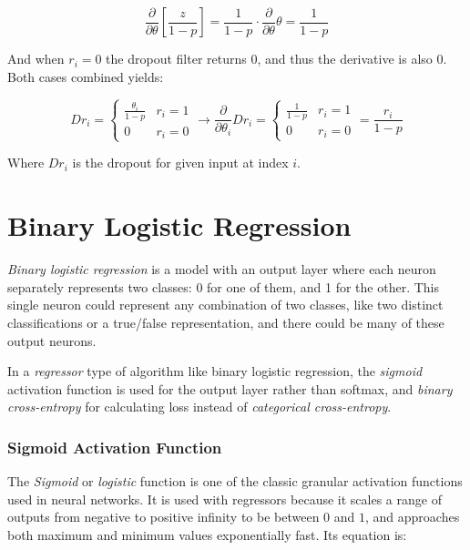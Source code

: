 \documentclass[a4paper]{article}
\begin{document}
\begin{equation*}
    \frac{\partial}{\partial\theta}\left[\frac{z}{1-p}\right] = \frac{1}{1-p} \cdot \frac{\partial}{\partial\theta}\theta = \frac{1}{1-p}
\end{equation*}

And when $r_i = 0$ the dropout filter returns $0$, and thus the derivative is also $0$. Both cases combined yields:

\begin{equation*}
    Dr_i = \begin{cases}
        \frac{\theta_i}{1-p} & r_i = 1 \\
        0 & r_i = 0
    \end{cases} \rightarrow \frac{\partial}{\partial\theta_i}Dr_i = \begin{cases}
        \frac{1}{1-p} & r_i = 1 \\
        0 & r_i = 0
    \end{cases} = \frac{r_i}{1-p}
\end{equation*}

Where $Dr_i$ is the dropout for given input at index $i$.

\section*{Binary Logistic Regression}
\emph{Binary logistic regression} is a model with an output layer where each neuron separately represents two classes: 0 for one of them, and 1 for the other. This single neuron could represent any combination of two classes, like two distinct classifications or a true/false representation, and there could be many of these output neurons.

In a \emph{regressor} type of algorithm like binary logistic regression, the \emph{sigmoid} activation function is used for the output layer rather than softmax, and \emph{binary cross-entropy} for calculating loss instead of \emph{categorical cross-entropy}.

\subsubsection*{Sigmoid Activation Function}
The \emph{Sigmoid} or \emph{logistic} function is one of the classic granular activation functions used in neural networks. It is used with regressors because it scales a range of outputs from negative to positive infinity to be between $0$ and $1$, and approaches both maximum and minimum values exponentially fast. Its equation is:
\end{document}
